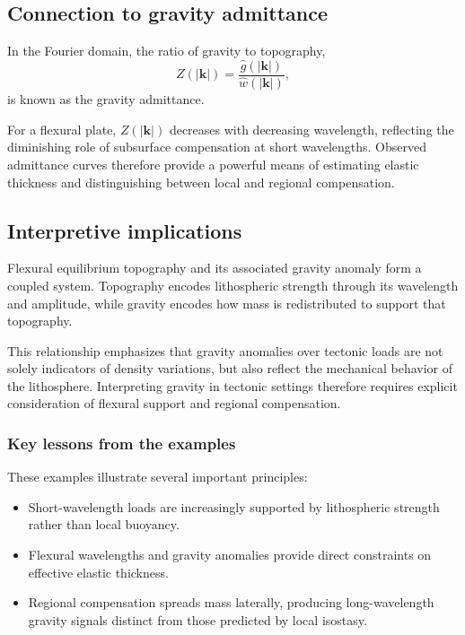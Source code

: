 \subsection{Connection to gravity admittance}

In the Fourier domain, the ratio of gravity to topography,
\begin{equation}
Z(|\mathbf{k}|) = \frac{\hat{g}(|\mathbf{k}|)}{\hat{w}(|\mathbf{k}|)},
\end{equation}
is known as the gravity admittance.

For a flexural plate, \(Z(|\mathbf{k}|)\) decreases with decreasing wavelength, reflecting the diminishing role of subsurface compensation at short wavelengths. Observed admittance curves therefore provide a powerful means of estimating elastic thickness and distinguishing between local and regional compensation.

\subsection{Interpretive implications}

Flexural equilibrium topography and its associated gravity anomaly form a coupled system. Topography encodes lithospheric strength through its wavelength and amplitude, while gravity encodes how mass is redistributed to support that topography.

This relationship emphasizes that gravity anomalies over tectonic loads are not solely indicators of density variations, but also reflect the mechanical behavior of the lithosphere. Interpreting gravity in tectonic settings therefore requires explicit consideration of flexural support and regional compensation.

\subsubsection{Key lessons from the examples}

These examples illustrate several important principles:
\begin{itemize}
    \item Short-wavelength loads are increasingly supported by lithospheric strength rather than local buoyancy.
    \item Flexural wavelengths and gravity anomalies provide direct constraints on effective elastic thickness.
    \item Regional compensation spreads mass laterally, producing long-wavelength gravity signals distinct from those predicted by local isostasy.
\end{itemize}

